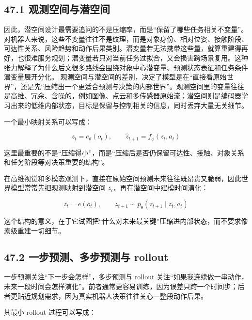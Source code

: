 \subsection*{47.1 观测空间与潜空间}


因此，潜空间设计最需要追问的不是压缩率，而是“保留了哪些任务相关不变量”。对机器人来说，这些不变量往往不是纹理，而是对象身份、相对位姿、接触阶段、可达性关系、风险趋势和动作后果类别。潜变量若无法携带这些量，就算重建得再好，也很难服务规划；潜变量若只对当前任务过拟合，又会损害跨场景复用。这种张力解释了为什么后文很多路线会围绕对象中心潜变量、预测状态表征和任务条件潜变量展开分化。 观测空间与潜空间的差别，决定了模型是在“直接看原始世界”，还是先“压缩出一个更适合预测与决策的内部世界”。观测空间里的变量往往是高维、冗余、含噪的，例如图像、点云和多传感器原始流；潜空间则是编码器学习出来的低维内部状态，目标是保留与控制相关的信息，同时丢弃大量无关细节。

一个最小映射关系可以写成：

\begingroup
\footnotesize
\begin{equation*}
z_t = e_\theta(o_t), \qquad \hat{z}_{t+1} = f_\phi(z_t, a_t)
\end{equation*}
\endgroup

这里最重要的不是“压缩得小”，而是“压缩后是否仍保留可达性、接触、对象关系和任务阶段等对决策重要的结构”。

在高维视觉和多模态观测下，直接在原始空间预测未来往往既昂贵又脆弱，因此世界模型常常先把观测映射到潜空间 \(z_t\)，再在潜空间中建模时间演化：

\begingroup
\footnotesize
\begin{equation*}
z_t = e(o_t), \qquad z_{t+1} \sim p_{\theta}(z_{t+1}\mid z_t, a_t)
\end{equation*}
\endgroup

这个结构的意义，在于它试图把“什么对未来最关键”压缩进内部状态，而不要求像素级重建一切细节。

\subsection*{47.2 一步预测、多步预测与 rollout}


一步预测关注“下一步会怎样”，多步预测与 rollout 关注“如果我连续做一串动作，未来一段时间会怎样演化”。前者通常更容易训练，因为误差只跨一个时间步；后者更贴近规划需求，因为真实机器人决策往往关心一整段动作后果。

其最小 rollout 过程可以写成：

